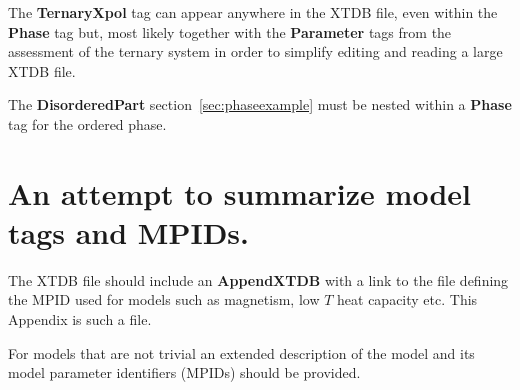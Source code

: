\documentclass{article}
\begin{document}
\begin{appendices}
The {\bf TernaryXpol} tag can appear anywhere in the XTDB file, even
within the {\bf Phase} tag but, most likely together with the {\bf
  Parameter} tags from the assessment of the ternary system in order
to simplify editing and reading a large XTDB file.

The {\bf DisorderedPart} section~\ref{sec:phaseexample} must be nested
within a {\bf Phase} tag for the ordered phase.

\newpage 

\setcounter{equation}{0}
\renewcommand{\theequation}{B\arabic{equation}}
\setcounter{figure}{0}
\renewcommand{\thefigure}{B\arabic{figure}}


\section{An attempt to summarize model tags and MPIDs.}\label{sec:modelapp}

The XTDB file should include an {\bf AppendXTDB} with a link to the
file defining the MPID used for models such as magnetism, low $T$ heat
capacity etc.  This Appendix is such a file.

For models that are not trivial an extended description of the model
and its model parameter identifiers (MPIDs) should be provided.


\end{appendices}
\end{document}
